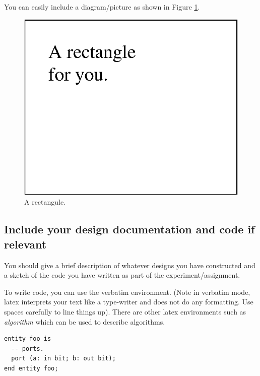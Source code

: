 \documentclass[12pt]{article}
\begin{document}
%
%
%
\noindent You can easily include a diagram/picture as shown in Figure \ref{fig:demofig}.
\begin{figure}
  \centering
  \includegraphics[scale=0.9]{figs/rectangle.eps}  %
  \caption{A rectangule.}
  \label{fig:demofig}
\end{figure}

\subsection{Include your design documentation and code if relevant}

You should give a brief description of whatever
designs you have constructed and a sketch of
the code you have written as part of the experiment/assignment.

\noindent To write code, you can use the verbatim environment.
(Note in verbatim mode, latex interprets your
text like a type-writer and does not do any formatting.  
Use spaces carefully to line things up).  There are other
latex environments such as {\em algorithm} which can 
be used to describe algorithms.
\begin{verbatim}
entity foo is
  -- ports.
  port (a: in bit; b: out bit);
end entity foo;
\end{verbatim}
\end{document}
